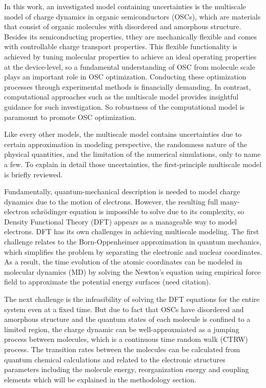 \documentclass[letterpaper,12pt]{article}
\begin{document}
In this work, an investigated model containing uncertainties is the multiscale model of charge dynamics in organic semiconductors (OSCs), which are materials that consist of organic molecules with disordered and amorphous structure. Besides its semiconducting properties, tthey are mechanically flexible and comes with controllable charge transport properties. 
This flexible functionality is achieved by tuning molecular properties to achieve an ideal operating properties at the device-level, so a fundamental understanding of OSC from molecule scale  plays an important role in OSC optimization.
Conducting these optimization processes through experimental methods is financially demanding. In contrast, computational approaches such as the multiscale model provides insightful guidance for such investigation. So robustness of the computational model is paramount to promote OSC optimization.

Like every other models, the multiscale model contains uncertainties due to certain approximation in modeling perspective, the randomness nature of the physical quantities, and the limitation of the numerical simulations, only to name a few.
To explain in detail those uncertainties, the first-principle multiscale model is briefly reviewed. 

Fundamentally, quantum-mechanical description is needed to model charge dynamics due to the motion of electrons. However, the resulting full many-electron schr\"{o}dinger equation is impossible to solve due to its complexity, so Density Functional Theory (DFT) appears as a manageable way to model electrons.
DFT has its own challenges in achieving multiscale modeling.
The first challenge relates to the Born-Oppenheimer approximation in quantum
mechanics, which simplifies the problem by separating the electronic and nuclear
coordinates. As a result, the time evolution of the atomic coordinates can be modeled in molecular dynamics (MD) by solving the Newton's equation using empirical force field to approximate the potential energy surfaces (need citation). 

The next challenge is the infeasibility of solving the DFT equations for the entire system even at a fixed time. 
But due to fact that OSCs have disordered and amorphous structure and the quantum states of each molecule is confined to a limited region, the charge dynamic can be well-approxmiated as a jumping process between molecules, which is a continuous time random walk (CTRW) process.
The transition rates between the molecules can be calculated from quantum chemical calculations and related to the electronic structures parameters including the molecule energy, reorganization energy and coupling elements which will be explained in the methodology section. 
\end{document}
